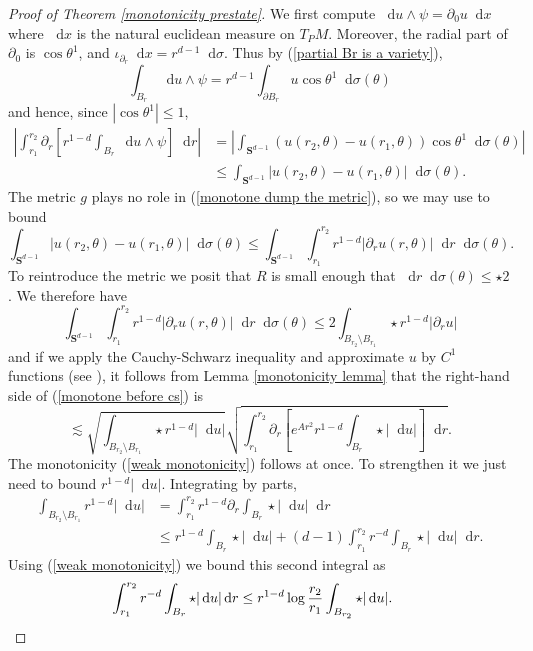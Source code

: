 \documentclass[reqno,10pt]{amsart}
\newcommand{\Sph}{\mathbf S}
\newcommand*\dif{\mathop{}\!\mathrm{d}}
\theoremstyle{definition}
\numberwithin{equation}{section}
\begin{document}
\begin{proof}[Proof of Theorem \ref{monotonicity prestate}]
We first compute $\dif u \wedge \psi = \partial_0 u \dif x$
where $\dif x$ is the natural euclidean measure on $T_PM$.
Moreover, the radial part of $\partial_0$ is $\cos \theta^1$, and $\iota_{\partial_r} \dif x = r^{d - 1} \dif \sigma$.
Thus by (\ref{partial Br is a variety}),
$$\int_{B_r} \dif u \wedge \psi = r^{d - 1}\int_{\partial B_r} u \cos \theta^1 \dif \sigma(\theta)$$
and hence, since $|\cos \theta^1| \leq 1$,
\begin{align}
\left|\int_{r_1}^{r_2} \partial_r \left[r^{1 - d}\int_{B_r} \dif u \wedge \psi\right] \dif r\right|
&= \left|\int_{\Sph^{d - 1}} (u(r_2, \theta) - u(r_1, \theta)) \cos \theta^1 \dif \sigma(\theta)\right| \\
&\leq \int_{\Sph^{d - 1}} |u(r_2, \theta) - u(r_1, \theta)| \dif \sigma(\theta). \label{monotone dump the metric}
\end{align}
The metric $g$ plays no role in (\ref{monotone dump the metric}), so we may use \cite[Lemma 5.3]{Giusti77} to bound
$$\int_{\Sph^{d - 1}} |u(r_2, \theta) - u(r_1, \theta)| \dif \sigma(\theta) \leq \int_{\Sph^{d - 1}} \int_{r_1}^{r_2} r^{1 - d}|\partial_r u(r, \theta)| \dif r \dif\sigma(\theta).$$
To reintroduce the metric we posit that $R$ is small enough that $\dif r \dif \sigma(\theta) \leq \star 2$.
We therefore have
\begin{equation}\label{monotone before cs}
\int_{\Sph^{d - 1}} \int_{r_1}^{r_2} r^{1 - d}|\partial_r u(r, \theta)| \dif r \dif\sigma(\theta) \leq 2 \int_{B_{r_2} \setminus B_{r_1}} \star r^{1 - d}|\partial_r u|
\end{equation}
and if we apply the Cauchy-Schwarz inequality and approximate $u$ by $C^1$ functions (see \cite[pg68]{Giusti77}), it follows from Lemma \ref{monotonicity lemma} that the right-hand side of (\ref{monotone before cs}) is
$$\lesssim \sqrt{\int_{B_{r_2} \setminus B_{r_1}} \star r^{1 - d} |\dif u|} \sqrt{\int_{r_1}^{r_2} \partial_r \left[e^{Ar^2} r^{1-d}\int_{B_r} \star |\dif u|\right] \dif r}.$$
The monotonicity (\ref{weak monotonicity}) follows at once. To strengthen it we just need to bound $r^{1 - d} |\dif u|$.
Integrating by parts,
\begin{align*}
\int_{B_{r_2} \setminus B_{r_1}} r^{1 - d} |\dif u| &= \int_{r_1}^{r_2} r^{1 - d} \partial_r \int_{B_r} \star |\dif u| \dif r \\
&\leq r^{1 - d} \int_{B_r} \star |\dif u| + (d - 1) \int_{r_1}^{r_2} r^{-d} \int_{B_r} \star |\dif u| \dif r.
\end{align*}
Using (\ref{weak monotonicity}) we bound this second integral as
\begin{align*}
\int_{r_1}^{r_2} r^{-d} \int_{B_r} \star |\dif u| \dif r &\leq r^{1 - d} \log \frac{r_2}{r_1} \int_{B_{r_2}} \star |\dif u|. \qedhere
\end{align*}
\end{proof}
\end{document}
